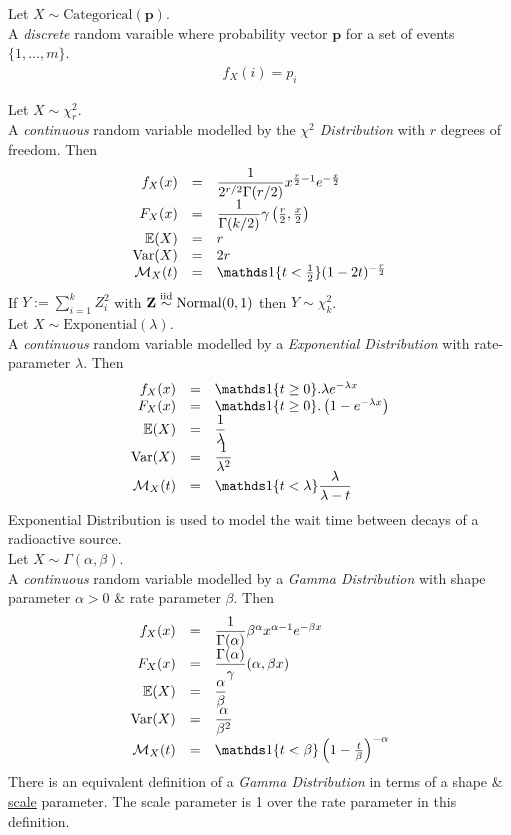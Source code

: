 \documentclass[11pt,a4paper]{article}
\begin{document}
Let $X\sim\text{Categorical}(\textbf{p})$.\\
A \textit{discrete} random varaible where probability vector $\textbf{p}$ for a set of events $\{1,\dots,m\}$.\\
\[\begin{array}{rcl}
f_X(i)=p_i
\end{array}\]

Let $X\sim\chi^2_r$.\\
A \textit{continuous} random variable modelled by the \textit{$\chi^2$ Distribution} with $r$ degrees of freedom. Then
\[\begin{array}{rcl}
f_X(x)&=&\dfrac{1}{2^{r/2}\Gamma(r/2)}x^{\frac{r}{2}-1}e^{-\frac{x}{2}}\\
F_X(x)&=&\dfrac{1}{\Gamma(k/2)}\gamma\left(\frac{r}{2},\frac{x}{2}\right)\\
\expect(X)&=&r\\
\var(X)&=&2r\\
\mathcal{M}_X(t)&=&\indicator\{t<\frac{1}{2}\}(1-2t)^{-\frac{r}{2}}
\end{array}\]
\nb If $Y:=\sum_{i=1}^kZ_i^2$ with $\textbf{Z}\overset{\text{iid}}{\sim}\text{Normal}(0,1)$ then $Y\sim\chi^2_k$.\\

Let $X\sim\text{Exponential}(\lambda)$.\\
A \textit{continuous} random variable modelled by a \textit{Exponential Distribution} with rate-parameter $\lambda$. Then
\[\begin{array}{rcl}
f_X(x)&=&\indicator\{t\geq0\}.\lambda e^{-\lambda x}\\
F_X(x)&=&\indicator\{t\geq0\}.\left(1-e^{-\lambda x}\right)\\
\expect(X)&=&\dfrac{1}{\lambda}\\
\var(X)&=&\dfrac{1}{\lambda^2}\\
\mathcal{M}_X(t)&=&\indicator\{t<\lambda\}\dfrac{\lambda}{\lambda-t}
\end{array}\]
\nb Exponential Distribution is used to model the wait time between decays of a radioactive source.\\

Let $X\sim\Gamma(\alpha,\beta)$.\\
A \textit{continuous} random variable modelled by a \textit{Gamma Distribution} with shape parameter $\alpha>0$ \& rate parameter $\beta$. Then
\[\begin{array}{rcll}
f_X(x)&=&\dfrac{1}{\Gamma(\alpha)}\beta^\alpha x^{\alpha-1}e^{-\beta x}\\
F_X(x)&=&\dfrac{\Gamma(\alpha)}\gamma(\alpha,\beta x)\\
\expect(X)&=&\dfrac{\alpha}{\beta}\\
\var(X)&=&\dfrac{\alpha}{\beta^2}\\
\mathcal{M}_X(t)&=&\indicator\{t<\beta\}\left(1-\frac{t}{\beta}\right)^{-\alpha}
\end{array}\]
\nb There is an equivalent definition of a \textit{Gamma Distribution} in terms of a shape \& \underline{scale} parameter. The scale parameter is 1 over the rate parameter in this definition.\\
\end{document}
